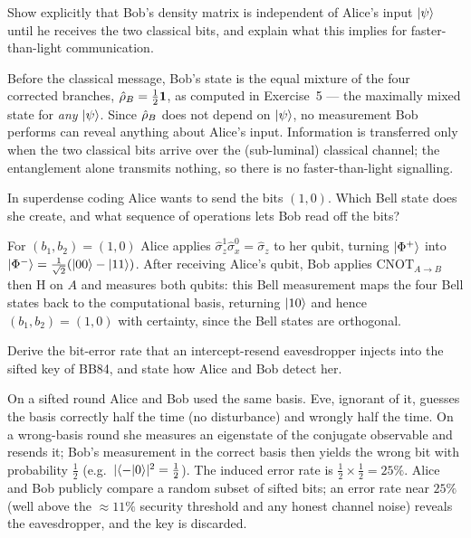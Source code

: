 \begin{exercise}
Show explicitly that Bob's density matrix is independent of Alice's
input $\ket{\psi}$ until he receives the two classical bits, and explain
what this implies for faster-than-light communication.
\begin{solution}
Before the classical message, Bob's state is the equal mixture of the
four corrected branches,
$\hat{\rho}_B=\tfrac12\mathbf{1}$, as computed in Exercise~5 --- the maximally
mixed state for \emph{any} $\ket{\psi}$. Since $\hat{\rho}_B$ does not
depend on $\ket{\psi}$, no measurement Bob performs can reveal anything
about Alice's input. Information is transferred only when the two
classical bits arrive over the (sub-luminal) classical channel; the
entanglement alone transmits nothing, so there is no faster-than-light
signalling.
\end{solution}
\end{exercise}

\begin{exercise}
In superdense coding Alice wants to send the bits $(1,0)$. Which Bell
state does she create, and what sequence of operations lets Bob read off
the bits?
\begin{solution}
For $(b_1,b_2)=(1,0)$ Alice applies
$\hat\sigma_z^{1}\hat\sigma_x^{0}=\hat\sigma_z$ to her qubit, turning
$\ket{\Phi^+}$ into $\ket{\Phi^-}=\tfrac{1}{\sqrt2}(\ket{00}-\ket{11})$.
After receiving Alice's qubit, Bob applies $\mathrm{CNOT}_{A\to B}$ then
$\mathrm{H}$ on $A$ and measures both qubits: this Bell measurement maps
the four Bell states back to the computational basis, returning
$\ket{10}$ and hence $(b_1,b_2)=(1,0)$ with certainty, since the Bell
states are orthogonal.
\end{solution}
\end{exercise}

\begin{exercise}
Derive the bit-error rate that an intercept-resend eavesdropper injects
into the sifted key of BB84, and state how Alice and Bob detect her.
\begin{solution}
On a sifted round Alice and Bob used the same basis. Eve, ignorant of
it, guesses the basis correctly half the time (no disturbance) and
wrongly half the time. On a wrong-basis round she measures an eigenstate
of the conjugate observable and resends it; Bob's measurement in the
correct basis then yields the wrong bit with probability $\tfrac12$
(e.g.\ $|\!\braket{-}{0}\!|^2=\tfrac12$). The induced error rate is
$\tfrac12\times\tfrac12=25\%$. Alice and Bob publicly compare a random
subset of sifted bits; an error rate near $25\%$ (well above the
$\approx11\%$ security threshold and any honest channel noise) reveals
the eavesdropper, and the key is discarded.
\end{solution}
\end{exercise}


